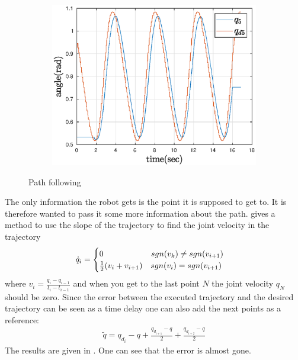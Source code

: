 \begin{figure}[htbp]
\begin{subfigure}[htbp]{0.45\textwidth}
        \includegraphics[width = \picsSiz\linewidth]{img/pathF5.eps}
        \caption{}
    \end{subfigure}
    \caption{Path following}
    \label{fig:pathTS}
\end{figure}
The only information the robot gets is the point it is supposed to get to. It is therefore wanted to pass it some more information about the path. \cite{Siciliano} gives a method to use the slope of the trajectory to find the joint velocity in the trajectory
\begin{align*}
    \dot{q}_i = 
    \begin{cases}
    0\hphantom{ \frac{1}{2}(v_i+v_{i+1})}\;\;sgn(v_k)\ne sgn(v_{i+1})\\
    \frac{1}{2}(v_i+v_{i+1}) \quad  sgn(v_i)= sgn(v_{i+1})
    \end{cases}
\end{align*}
where $v_i = \frac{q_i-q_{i-1}}{t_i-t_{i-1}}$ and when you get to the last point $N$ the joint velocity $q_N$ should be zero. Since the error between the executed trajectory and the desired trajectory can be seen as a time delay one can also add the next points as a reference:
\begin{align*}
    \tilde{q} = q_{d_i}-q + \frac{q_{d_{i+1}}-q }{2}+\frac{q_{d_{i+2}}-q }{2}
\end{align*}
The results are given in . One can see that the error is almost gone. 



